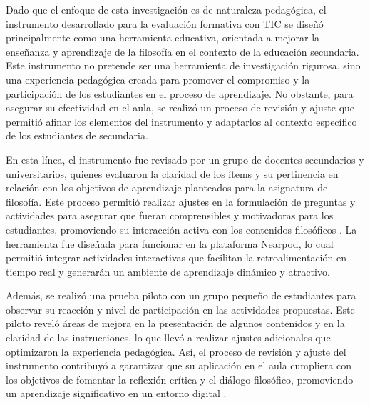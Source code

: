 \documentclass[spanish]{textolivre}
\begin{document}
Dado que el enfoque de esta investigación es de naturaleza pedagógica, el instrumento desarrollado para la evaluación formativa con TIC se diseñó principalmente como una herramienta educativa, orientada a mejorar la enseñanza y aprendizaje de la filosofía en el contexto de la educación secundaria. Este instrumento no pretende ser una herramienta de investigación rigurosa, sino una experiencia pedagógica creada para promover el compromiso y la participación de los estudiantes en el proceso de aprendizaje. No obstante, para asegurar su efectividad en el aula, se realizó un proceso de revisión y ajuste que permitió afinar los elementos del instrumento y adaptarlos al contexto específico de los estudiantes de secundaria.

En esta línea, el instrumento fue revisado por un grupo de docentes secundarios y universitarios, quienes evaluaron la claridad de los ítems y su pertinencia en relación con los objetivos de aprendizaje planteados para la asignatura de filosofía. Este proceso permitió realizar ajustes en la formulación de preguntas y actividades para asegurar que fueran comprensibles y motivadoras para los estudiantes, promoviendo su interacción activa con los contenidos filosóficos \cite{gutiérrez2019}. La herramienta fue diseñada para funcionar en la plataforma Nearpod, lo cual permitió integrar actividades interactivas que facilitan la retroalimentación en tiempo real y generarán un ambiente de aprendizaje dinámico y atractivo.

Además, se realizó una prueba piloto con un grupo pequeño de estudiantes para observar su reacción y nivel de participación en las actividades propuestas. Este piloto reveló áreas de mejora en la presentación de algunos contenidos y en la claridad de las instrucciones, lo que llevó a realizar ajustes adicionales que optimizaron la experiencia pedagógica. Así, el proceso de revisión y ajuste del instrumento contribuyó a garantizar que su aplicación en el aula cumpliera con los objetivos de fomentar la reflexión crítica y el diálogo filosófico, promoviendo un aprendizaje significativo en un entorno digital \cite{flores2021}.
\end{document}
